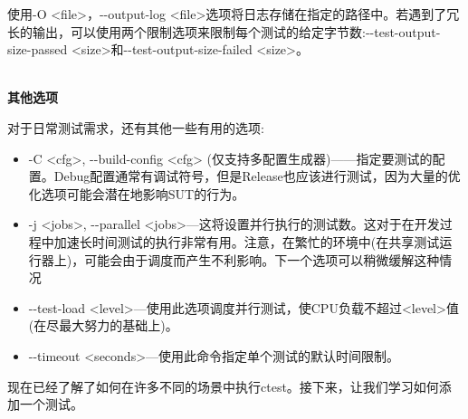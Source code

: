 使用-O <file>，-{}-output-log <file>选项将日志存储在指定的路径中。若遇到了冗长的输出，可以使用两个限制选项来限制每个测试的给定字节数:-{}-test-output-size-passed <size>和-{}-test-output-size-failed <size>。

\hspace*{\fill} \\ %
\noindent
\textbf{其他选项}

对于日常测试需求，还有其他一些有用的选项:

\begin{itemize}
\item 
-C <cfg>, -{}-build-config <cfg> (仅支持多配置生成器)——指定要测试的配置。Debug配置通常有调试符号，但是Release也应该进行测试，因为大量的优化选项可能会潜在地影响SUT的行为。

\item 
-j <jobs>, -{}-parallel <jobs>—这将设置并行执行的测试数。这对于在开发过程中加速长时间测试的执行非常有用。注意，在繁忙的环境中(在共享测试运行器上)，可能会由于调度而产生不利影响。下一个选项可以稍微缓解这种情况

\item 
-{}-test-load <level>—使用此选项调度并行测试，使CPU负载不超过<level>值(在尽最大努力的基础上)。

\item 
-{}-timeout <seconds>—使用此命令指定单个测试的默认时间限制。
\end{itemize}

现在已经了解了如何在许多不同的场景中执行ctest。接下来，让我们学习如何添加一个测试。


























